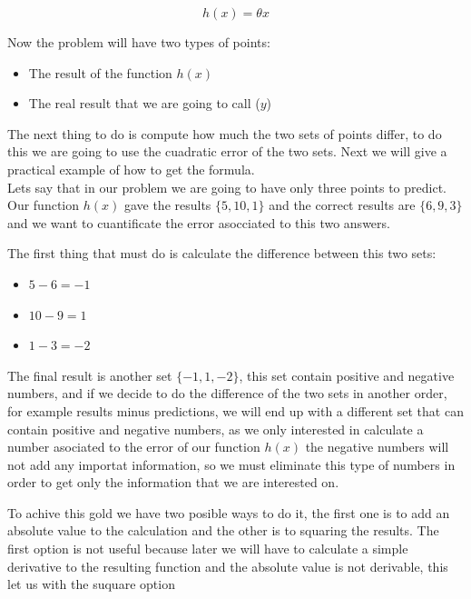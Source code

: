 \documentclass[12pt,journal]{IEEEtran}
\begin{document}
    \begin{equation}
        h(x) = \theta x
    \end{equation}

    Now the problem will have two types of points: \\

    \begin{itemize}
        \item The result of the function $h(x)$
        \item The real result that we are going to call ($y$) \\
    \end{itemize}

    The next thing to do is compute how much the two sets of points differ, to
    do this we are going to use the cuadratic error of the two sets. Next we
    will give a practical example of how to get the formula. \\

    Lets say that in our problem we are going to have only three points to
    predict. Our function $h(x)$ gave the results $\{5,10,1\}$ and the correct
    results are $\{6,9,3\}$ and we want to cuantificate the error asocciated to
    this two answers.

    The first thing that must do is calculate the difference between this two
    sets:\\

    \begin{itemize}
        \item $5-6 = -1$
        \item $10-9 = 1$
        \item $1-3 = -2$ \\
    \end{itemize}

    The final result is another set $\{-1,1,-2\}$, this set contain positive and
    negative numbers, and if we decide to do the difference of the two sets in
    another order, for example results minus predictions, we will end up with a
    different set that can contain positive and negative numbers, as we only
    interested in calculate a number asociated to the error of our function
    $h(x)$ the negative numbers will not add any importat information, so we
    must eliminate this type of numbers in order to get only the information
    that we are interested on.

    To achive this gold we have two posible ways to do it, the first one is to
    add an absolute value to the calculation and the other is to squaring the
    results. The first option is not useful because later we will have to
    calculate a simple derivative to the resulting function and the absolute
    value is not derivable, this let us with the suquare option\\
\end{document}
